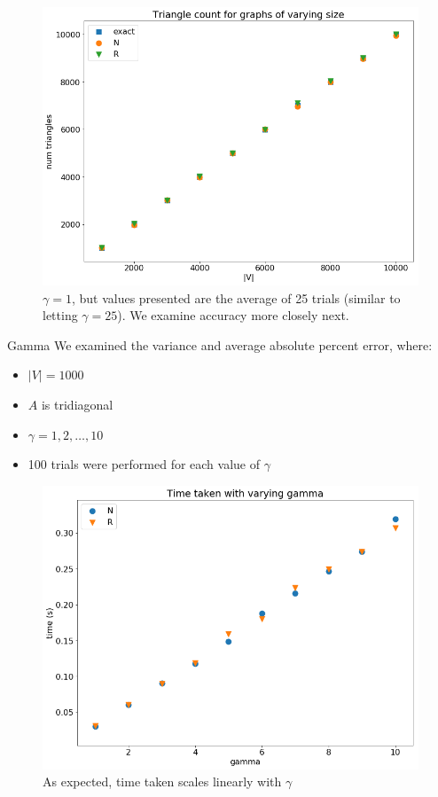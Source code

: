 \documentclass{beamer}
\begin{document}
\begin{frame}
    \begin{figure}
        \centering
        \includegraphics[width=0.7\linewidth]{figs/size-count.png}
        \caption{$\gamma = 1$, but values presented are the average of 25 trials (similar to letting $\gamma = 25$). We examine accuracy more closely next.}
        \label{fig:size-time}
    \end{figure}
\end{frame}

\begin{frame}{Gamma}
    We examined the variance and average absolute percent error, where:
    
    \begin{itemize}
        \item $|V| = 1000$
        \item $A$ is tridiagonal
        \item $\gamma = 1, 2, \ldots, 10$
        \item 100 trials were performed for each value of $\gamma$
    \end{itemize}
\end{frame}

\begin{frame}
    \begin{figure}
        \centering
        \includegraphics[width=0.7\linewidth]{figs/gamma-time.png}
        \caption{As expected, time taken scales linearly with $\gamma$}
        \label{fig:gamma-time}
    \end{figure}
\end{frame}
\end{document}
